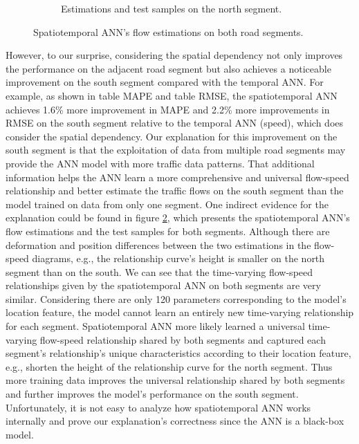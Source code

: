 \documentclass[english]{kththesis}
\begin{document}
\begin{figure}[!ht]
\begin{subfigure}{0.49\textwidth}
        \caption{Estimations and test samples on the north segment.}
        \label{subfig:spatiotemporal_ann_north}
    \end{subfigure}
    \caption{Spatiotemporal ANN's flow estimations on both road segments.}
    \label{fig:spatiotemporal_ann}
\end{figure}

However, to our surprise, considering the spatial dependency not only improves the performance on the adjacent road segment but also achieves a noticeable improvement on the south segment compared with the temporal ANN. For example, as shown in table MAPE and table RMSE, the spatiotemporal ANN achieves 1.6\% more improvement in MAPE and 2.2\% more improvements in RMSE on the south segment relative to the temporal ANN (speed), which does consider the spatial dependency. Our explanation for this improvement on the south segment is that the exploitation of data from multiple road segments may provide the ANN model with more traffic data patterns. That additional information helps the ANN learn a more comprehensive and universal flow-speed relationship and better estimate the traffic flows on the south segment than the model trained on data from only one segment. One indirect evidence for the explanation could be found in figure \ref{fig:spatiotemporal_ann}, which presents the spatiotemporal ANN's flow estimations and the test samples for both segments. Although there are deformation and position differences between the two estimations in the flow-speed diagrams, e.g., the relationship curve's height is smaller on the north segment than on the south. We can see that the time-varying flow-speed relationships given by the spatiotemporal ANN on both segments are very similar. Considering there are only 120 parameters corresponding to the model's location feature, the model cannot learn an entirely new time-varying relationship for each segment. Spatiotemporal ANN more likely learned a universal time-varying flow-speed relationship shared by both segments and captured each segment's relationship's unique characteristics according to their location feature, e.g., shorten the height of the relationship curve for the north segment. Thus more training data improves the universal relationship shared by both segments and further improves the model's performance on the south segment. Unfortunately, it is not easy to analyze how spatiotemporal ANN works internally and prove our explanation's correctness since the ANN is a black-box model.
\end{document}
